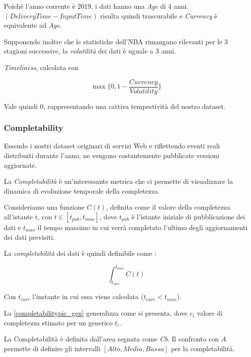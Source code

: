 Poichè l'anno corrente è 2019, i dati hanno una \textit{Age} di 4 anni. $(DeliveryTime - InputTime)$ risulta quindi trascurabile e \textit{Currency} è equivalente  ad \textit{Age}.

Supponendo inoltre che le statistiche dell'NBA rimangano rilevanti per le 3 stagioni successive, la \textit{volatilità} dei dati è uguale a 3 anni.

\textit{Timeliness}, calcolata con 

\begin{equation}
\max\{{0, 1 - \frac{Currency}{Volatility}}\}
\end{equation}

Vale quindi 0, rappresentando una cattiva tempestività del nostro dataset.

\pagebreak
\subsubsection{Completability}
Essendo i nostri dataset originari di servizi Web e riflettendo eventi reali distribuiti durante l'anno, ne vengono costantemente pubblicate versioni aggiornate.

La \textit{Completabilità} è un'interessante metrica che ci permette di visualizzare la dinamica di evoluzione temporale della completezza.

Consideriamo una funzione $C(t)$, definita come il valore della completezza all'istante t, con $t \in [t_{pub}, t_{max}]$, dove $t_{pub}$ è l'istante iniziale di pubblicazione dei dati e $t_{max}$ il tempo massimo in cui verrà completato l'ultimo degli aggiornamenti dei dati previsiti.

La \textit{completabilità} dei dati è quindi definibile come \cite{batini2006}:

\begin{equation}
\int_{t_{curr}}^{t_{max}} C(t)
\end{equation}

Con $t_{curr}$ l'instante in cui essa viene calcolata ($t_{curr} < t_{max}$).

La \autoref{completabilitypic_gen} generalizza come si presenta, dove $c_{i}$ valore di completezza stimato per un generico $t_{i}$.


La Completabilità è definita dall'area segnata come \textit{Cb}. Il confronto con $A$ permette di definire gli intervalli $[Alto, Media, Bassa]$ per la completabilità.


